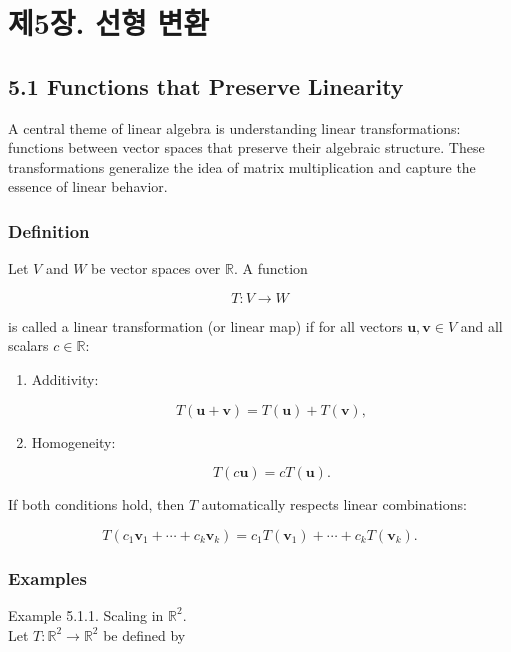 \documentclass[
  12pt,
  a4paper,
]{article}
\let\oldsection\section
\renewcommand{\section}{\clearpage\oldsection}
\begin{document}
\section{제5장. 선형
변환}\label{chapter-5-linear-transformations}

\subsection{5.1 Functions that Preserve
Linearity}\label{51-functions-that-preserve-linearity}

A central theme of linear algebra is understanding linear
transformations: functions between vector spaces that preserve their
algebraic structure. These transformations generalize the idea of matrix
multiplication and capture the essence of linear behavior.

\subsubsection{Definition}\label{definition-3}

Let \(V\) and \(W\) be vector spaces over \(\mathbb{R}\). A function

\[T : V \to W\]

is called a linear transformation (or linear map) if for all vectors
\(\mathbf{u}, \mathbf{v} \in V\) and all scalars \(c \in \mathbb{R}\):

\begin{enumerate}
\def\labelenumi{\arabic{enumi}.}
\item
  Additivity:

  \[T(\mathbf{u} + \mathbf{v}) = T(\mathbf{u}) + T(\mathbf{v}),\]
\item
  Homogeneity:

  \[T(c\mathbf{u}) = cT(\mathbf{u}).\]
\end{enumerate}

If both conditions hold, then \(T\) automatically respects linear
combinations:

\[T(c_1\mathbf{v}_1 + \cdots + c_k\mathbf{v}_k) = c_1 T(\mathbf{v}_1) + \cdots + c_k T(\mathbf{v}_k).\]

\subsubsection{Examples}\label{examples-4}

Example 5.1.1. Scaling in \(\mathbb{R}^2\).\\
Let \(T:\mathbb{R}^2 \to \mathbb{R}^2\) be defined by
\end{document}
